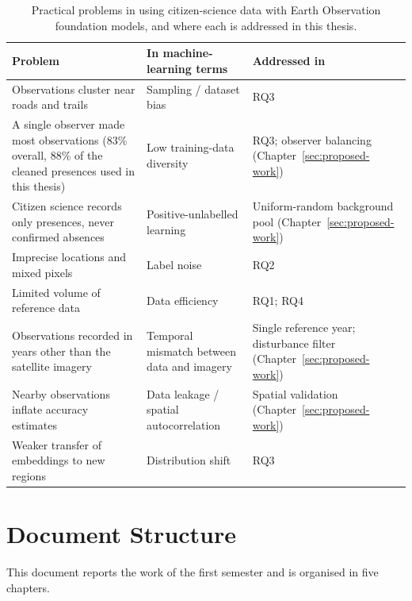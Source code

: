 \begin{table}[htb]
\centering
\begin{tabularx}{\textwidth}{|>{\raggedright\arraybackslash}X|>{\raggedright\arraybackslash}X|>{\raggedright\arraybackslash}X|}
\hline
\textbf{Problem} & \textbf{In machine-learning terms} & \textbf{Addressed in} \\
\hline
Observations cluster near roads and trails \cite{dimson2023} &
Sampling / dataset bias & RQ3 \\
\hline
A single observer made most observations (83\% overall, 88\% of the
cleaned presences used in this thesis) & Low training-data diversity &
RQ3; observer balancing (Chapter~\ref{sec:proposed-work}) \\
\hline
Citizen science records only presences, never confirmed absences
\cite{phillips2009} & Positive-unlabelled learning & Uniform-random
background pool (Chapter~\ref{sec:proposed-work}) \\
\hline
Imprecise locations and mixed pixels \cite{ball2026} & Label noise &
RQ2 \\
\hline
Limited volume of reference data & Data efficiency & RQ1; RQ4 \\
\hline
Observations recorded in years other than the satellite imagery
\cite{ball2026} & Temporal mismatch between data and imagery & Single
reference year; disturbance filter (Chapter~\ref{sec:proposed-work}) \\
\hline
Nearby observations inflate accuracy estimates \cite{karasiak2022} &
Data leakage / spatial autocorrelation & Spatial validation
(Chapter~\ref{sec:proposed-work}) \\
\hline
Weaker transfer of embeddings to new regions \cite{zhu2026} &
Distribution shift & RQ3 \\
\hline
\end{tabularx}
\caption{Practical problems in using citizen-science data with Earth
Observation foundation models, and where each is addressed in this
thesis.}
\label{tab:introduction-problems}
\end{table}

\section{Document Structure}
\label{sec:introduction-structure}
This document reports the work of the first semester and is
organised in five chapters.

